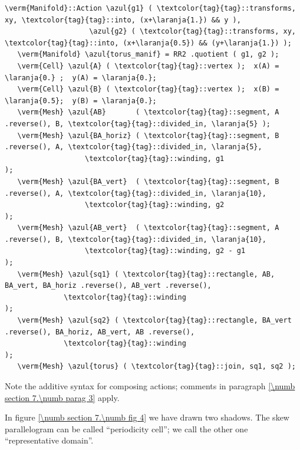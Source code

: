 \begin{Verbatim}[commandchars=\\\{\},formatcom=\small\tt,frame=single,
   label=parag-\ref{\numb section 7.\numb parag 8}.cpp,rulecolor=\color{moldura},
   baselinestretch=0.94,framesep=2mm                                            ]
   \verm{Manifold}::Action \azul{g1} ( \textcolor{tag}{tag}::transforms, xy, \textcolor{tag}{tag}::into, (x+\laranja{1.}) && y ),
                    \azul{g2} ( \textcolor{tag}{tag}::transforms, xy, \textcolor{tag}{tag}::into, (x+\laranja{0.5}) && (y+\laranja{1.}) );
   \verm{Manifold} \azul{torus_manif} = RR2 .quotient ( g1, g2 );
   \verm{Cell} \azul{A} ( \textcolor{tag}{tag}::vertex );  x(A) = \laranja{0.} ;  y(A) = \laranja{0.};
   \verm{Cell} \azul{B} ( \textcolor{tag}{tag}::vertex );  x(B) = \laranja{0.5};  y(B) = \laranja{0.};
   \verm{Mesh} \azul{AB}       ( \textcolor{tag}{tag}::segment, A .reverse(), B, \textcolor{tag}{tag}::divided_in, \laranja{5} );
   \verm{Mesh} \azul{BA_horiz} ( \textcolor{tag}{tag}::segment, B .reverse(), A, \textcolor{tag}{tag}::divided_in, \laranja{5},
                   \textcolor{tag}{tag}::winding, g1                                  );
   \verm{Mesh} \azul{BA_vert}  ( \textcolor{tag}{tag}::segment, B .reverse(), A, \textcolor{tag}{tag}::divided_in, \laranja{10},
                   \textcolor{tag}{tag}::winding, g2                                   );
   \verm{Mesh} \azul{AB_vert}  ( \textcolor{tag}{tag}::segment, A .reverse(), B, \textcolor{tag}{tag}::divided_in, \laranja{10},
                   \textcolor{tag}{tag}::winding, g2 - g1                              );
   \verm{Mesh} \azul{sq1} ( \textcolor{tag}{tag}::rectangle, AB, BA_vert, BA_horiz .reverse(), AB_vert .reverse(),
              \textcolor{tag}{tag}::winding                                                         );
   \verm{Mesh} \azul{sq2} ( \textcolor{tag}{tag}::rectangle, BA_vert .reverse(), BA_horiz, AB_vert, AB .reverse(),
              \textcolor{tag}{tag}::winding                                                         );
   \verm{Mesh} \azul{torus} ( \textcolor{tag}{tag}::join, sq1, sq2 );
\end{Verbatim}

Note the additive syntax for composing actions; comments in paragraph
\ref{\numb section 7.\numb parag 3} apply.

In figure \ref{\numb section 7.\numb fig 4} we have drawn two shadows.
The skew parallelogram can be called ``periodicity cell'';
we call the other one ``representative domain''.

